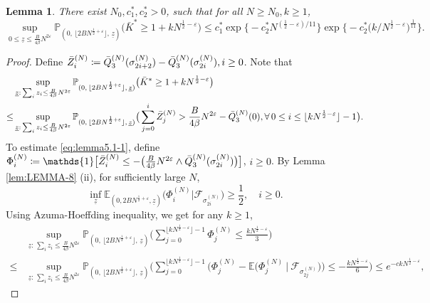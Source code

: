 \documentclass[11pt, reqno]{article}
\newtheorem{lemma}[theorem]{Lemma}
\numberwithin{equation}{section}
\numberwithin{theorem}{section}
\begin{document}
\begin{appendix}
\begin{lemma}\label{lem:bar-q3-positive}
 There exist $ N_0, c^*_1,c^*_2>0$, such that for all $N\geq N_0,k\geq 1$,
$$\sup_{0\leq\underline{z}\leq \frac{B}{4\beta}N^{2\varepsilon}}\mathbb{P}_{(0, \, \lfloor 2BN^{\frac{1}{2}+\varepsilon} \rfloor, \,\underline{z})}\big(\bar{K}^{*}\geq 1+kN^{\frac{1}{2}-\varepsilon}\big)\leq c^*_1\exp \big\{-c^*_2N^{(\frac{1}{2}-\varepsilon)/11}\big\}\exp \Big\{-c^*_2\big(k/N^{\frac{1}{2}-\varepsilon}\big)^{\frac{1}{11}}\Big\}.$$
\end{lemma}
\begin{proof}%
Define $\Bar{Z}^{(N)}_i\coloneqq \Bar{Q}^{(N)}_3(\sigma^{(N)}_{2i+2})-\Bar{Q}^{(N)}_3(\sigma^{(N)}_{2i}),i\geq 0$.
Note that 
\begin{align}\label{eq:lemma5.1-1}
    &\sup_{\underline{z}: \, \sum_iz_i \leq \frac{B}{4\beta}N^{2\varepsilon}}\mathbb{P}_{(0, \, \lfloor 2BN^{\frac{1}{2}+\varepsilon} \rfloor, \,\underline{z})}\big(\Bar{K}^{*}\geq 1+kN^{\frac{1}{2}-\varepsilon}\big)\nonumber\\
    \leq &\sup_{\underline{z}: \, \sum_iz_i \leq \frac{B}{4\beta}N^{2\varepsilon}}\mathbb{P}_{(0, \, \lfloor 2BN^{\frac{1}{2}+\varepsilon} \rfloor, \,\underline{z})}\big(\sum_{j=0}^{i}\Bar{Z}^{(N)}_j>\frac{B}{4\beta}N^{2\varepsilon}-\bar{Q}^{(N)}_3(0),\forall \, 0\leq i\leq \lfloor kN^{\frac{1}{2}-\varepsilon}\rfloor -1\big).
\end{align}
To estimate \eqref{eq:lemma5.1-1}, define $\Phi^{(N)}_i\coloneqq \mathds{1}\big[\Bar{Z}^{(N)}_i\leq -\big(\frac{B}{4\beta}N^{2\varepsilon}\wedge \Bar{Q}^{(N)}_3(\sigma^{(N)}_{2i})\big) \big]$, $i\geq 0$. By Lemma \ref{lem:LEMMA-8} (ii), for sufficiently large $N$,
\begin{equation}\label{eq:lemma5.1-3}
    \inf_{\underline{z}}\mathbb{E}_{(0,2BN^{\frac{1}{2}+\varepsilon},\underline{z})}\big(\Phi^{(N)}_i|\mathcal{F}_{\sigma^{(N)}_{2i}}\big)\geq \frac{1}{2},\quad i\geq 0.
\end{equation}
Using Azuma-Hoeffding inequality, we get for any $k\geq 1$,
\begin{equation}\label{eq:5.2-b}
\begin{split}
     &\sup_{\underline{z}: \, \sum_iz_i \leq \frac{B}{4\beta}N^{2\varepsilon}}\mathbb{P}_{(0, \, \lfloor 2BN^{\frac{1}{2}+\varepsilon} \rfloor, \,\underline{z})}\Big(\sum_{j=0}^{\lfloor kN^{\frac{1}{2}-\varepsilon}\rfloor -1}\Phi^{(N)}_j\leq \frac{kN^{\frac{1}{2}-\varepsilon}}{3}\Big)\\
    \leq & \sup_{\underline{z}: \, \sum_iz_i \leq \frac{B}{4\beta}N^{2\varepsilon}}\mathbb{P}_{(0, \, \lfloor 2BN^{\frac{1}{2}+\varepsilon} \rfloor, \,\underline{z})}\Big(\sum_{j=0}^{\lfloor kN^{\frac{1}{2}-\varepsilon}\rfloor-1}\big(\Phi^{(N)}_j-\mathbb{E}\big(\Phi^{(N)}_j\ \big|\ \mathcal{F}_{\sigma^{(N)}_{2j}}\big)\big)\leq -\frac{kN^{\frac{1}{2}-\varepsilon}}{6}\Big)\leq e^{-ckN^{\frac{1}{2}-\varepsilon}},

\end{split}
\end{equation}
\end{proof}
\end{appendix}
\end{document}
